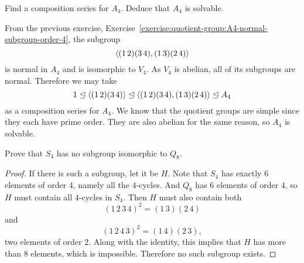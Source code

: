  Find a composition series for $A_4$. Deduce that $A_4$
is solvable.
\begin{solution}
  From the previous exercise,
  Exercise~\ref{exercise:quotient-group:A4-normal-subgroup-order-4},
  the subgroup
  \begin{equation*}
    \langle{(1\,2)(3\,4), (1\,3)(2\,4)}\rangle
  \end{equation*}
  is normal in $A_4$ and is isomorphic to $V_4$. As $V_4$ is abelian,
  all of its subgroups are normal. Therefore we may take
  \begin{equation*}
    1 \trianglelefteq \langle{(1\,2)(3\,4)}\rangle \trianglelefteq
    \langle{(1\,2)(3\,4), (1\,3)(2\,4)}\rangle \trianglelefteq A_4
  \end{equation*}
  as a composition series for $A_4$. We know that the quotient groups
  are simple since they each have prime order. They are also abelian
  for the same reason, so $A_4$ is solvable.
\end{solution}

 Prove that $S_4$ has no subgroup isomorphic to $Q_8$.
\begin{proof}
  If there is such a subgroup, let it be $H$. Note that $S_4$ has
  exactly $6$ elements of order $4$, namely all the $4$-cycles. And
  $Q_8$ has $6$ elements of order $4$, so $H$ must contain all
  $4$-cycles in $S_4$. Then $H$ must also contain both
  \begin{equation*}
    (1\,2\,3\,4)^2 = (1\,3)(2\,4)
  \end{equation*}
  and
  \begin{equation*}
    (1\,2\,4\,3)^2 = (1\,4)(2\,3),
  \end{equation*}
  two elements of order $2$. Along with the identity, this implies
  that $H$ has more than $8$ elements, which is impossible. Therefore
  no such subgroup exists.
\end{proof}
